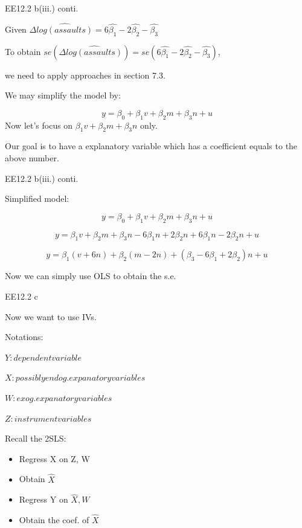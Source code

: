 \begin{frame}[fragile]{EE12.2 b(iii.) conti.}

Given $\Delta \widehat{log(assaults)} = 6\hat{\beta_1} - 2 \hat{\beta_2}-\hat{\beta_3}$

To obtain $se(\Delta \widehat{log(assaults)}) = se(6\hat{\beta_1} - 2 \hat{\beta_2}-\hat{\beta_3})$,

we need to apply approaches in section 7.3.

We may simplify the model by:

$$y =\beta_0 + \beta_1 v+\beta_2 m + \beta_3 n + u$$
Now let's focus on $\beta_1 v+\beta_2 m + \beta_3 n$ only.

Our goal is to have a explanatory variable which has a coefficient equals to the above number.

\end{frame}


\begin{frame}[fragile]{EE12.2 b(iii.) conti.}

Simplified model:

$$y =\beta_0 + \beta_1 v+\beta_2 m + \beta_3 n + u$$

$$y = \beta_1 v+\beta_2 m + \beta_3 n -6\beta_1 n+2\beta_2 n + 6\beta_1 n-2\beta_2 n +u$$

$$y = \beta_1 (v+6n)+\beta_2 (m-2n) + (\beta_3-6\beta_1+2\beta_2) n +u$$

Now we can simply use OLS to obtain the s.e.
\end{frame}

\begin{frame}[fragile]{EE12.2 c}

Now we want to use IVs.

Notations:

$Y: dependent variable$


$X: possibly endog. expanatory variables$

$W: exog. expanatory variables$

$Z: instrument variables$


Recall the 2SLS:

\begin{itemize}
    \item Regress X on Z, W
    \item Obtain $\hat{X}$
    \item Regress Y on $\hat{X}, W$
    \item Obtain the coef. of $\hat{X}$
\end{itemize}

\end{frame}


